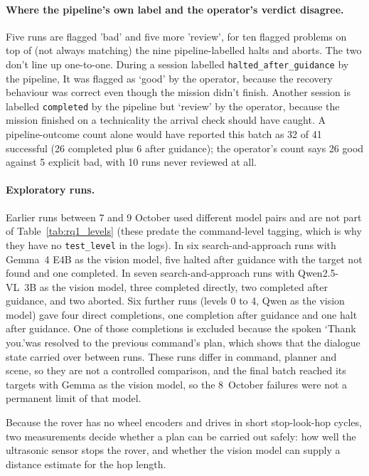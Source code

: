 \paragraph{Where the pipeline's own label and the operator's verdict disagree.} Five runs are flagged 'bad' and
five more 'review', for ten flagged problems on top of (not always matching) the nine pipeline-labelled halts and
aborts. The two don't line up one-to-one. During a session labelled \texttt{halted\_after\_guidance} by the
pipeline, It was flagged as `good' by the operator, because the recovery behaviour was correct even though the mission didn't
finish. Another session is labelled \texttt{completed} by the pipeline but `review' by the operator, because
the mission finished on a technicality the arrival check should have caught. A pipeline-outcome count alone would
have reported this batch as 32 of 41 successful (26 completed plus 6 after guidance); the operator's count says 26
good against 5 explicit bad, with 10 runs never reviewed at all.

\paragraph{Exploratory runs.} Earlier runs between 7 and 9 October used different model pairs and are not part of
Table~\ref{tab:rq1_levels} (these predate the command-level tagging, which is why they have no \texttt{test\_level}
in the logs). In six search-and-approach runs with Gemma~4 E4B as the vision model, five halted after guidance with
the target not found and one completed. In seven search-and-approach runs with Qwen2.5-VL~3B as the vision model,
three completed directly, two completed after guidance, and two aborted. Six further runs (levels 0 to
4, Qwen as the vision model) gave four direct completions, one completion after guidance and one halt after
guidance. One of those completions is excluded because the spoken `Thank you.'was resolved to the previous
command's plan, which shows that the dialogue state carried over between runs. These runs differ in command,
planner and scene, so they are not a controlled comparison, and the final batch reached its targets with Gemma as
the vision model, so the 8~October failures were not a permanent limit of that model.


\label{sec:executability}

Because the rover has no wheel encoders and drives in 
short stop-look-hop cycles, two measurements decide whether a 
plan can be carried out safely: how well the ultrasonic sensor stops the rover, 
and whether the vision model can supply a distance estimate for the hop length.

